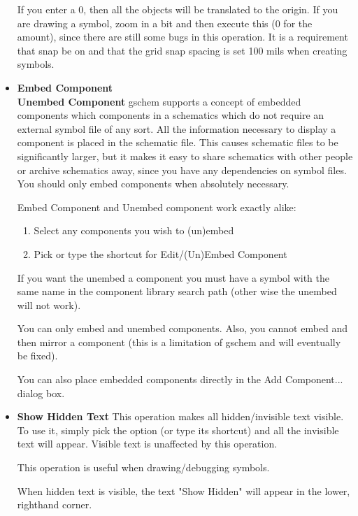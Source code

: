 \documentclass{article}
\begin{document}
\begin{itemize}
  If you enter a 0, then all the objects will be translated to the
  origin.  If you are drawing a symbol, zoom in a bit and then execute
  this (0 for the amount), since there are still some bugs in this
  operation.  It is a requirement that snap be on and that the grid
  snap spacing is set 100 mils when creating symbols.
  
\item {\bf Embed Component} \\ {\bf Unembed Component} gschem supports
  a concept of embedded components which components in a schematics
  which do not require an external symbol file of any sort.  All the
  information necessary to display a component is placed in the
  schematic file.  This causes schematic files to be significantly
  larger, but it makes it easy to share schematics with other people
  or archive schematics away, since you have any dependencies on
  symbol files.  You should only embed components when absolutely
  necessary.
  
  Embed Component and Unembed component work exactly alike:
\begin{enumerate}
\item Select any components you wish to (un)embed
\item Pick or type the shortcut for Edit/(Un)Embed Component
\end{enumerate}
If you want the unembed a component you must have a symbol with the
same name in the component library search path (other wise the unembed
will not work).

You can only embed and unembed components.  Also, you cannot embed and
then mirror a component (this is a limitation of gschem and will
eventually be fixed).

You can also place embedded components directly in the Add
Component... dialog box.

\item {\bf Show Hidden Text} This operation makes all hidden/invisible
  text visible.  To use it, simply pick the option (or type its
  shortcut) and all the invisible text will appear.  Visible text is
  unaffected by this operation.
  
  This operation is useful when drawing/debugging symbols.
                
  When hidden text is visible, the text "Show Hidden" will appear in
  the lower, righthand corner.

\end{itemize}
\end{document}
